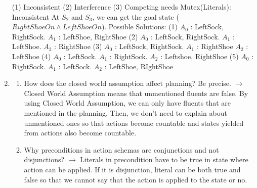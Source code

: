 \documentclass[10pt]{article}
\begin{document}
\begin{enumerate}
\newline
(1) Inconsistent \newline
(2) Interference \newline
(3) Competing needs \newline
\newline
Mutex(Literals): Inconsistent \newline
\newline
At $S_2$ and $S_3$, we can get the goal state ($RightShoeOn \wedge LeftShoeOn$). \newline
Possible Solutions: \newline
(1) $A_0$ : LeftSock, RightSock. \space $A_1$ : LeftShoe, RightShoe \newline
(2) $A_0$ : LeftSock, RightSock. \space $A_1$ : LeftShoe. \space $A_2$ : RightShoe \newline
(3) $A_0$ : LeftSock, RightSock. \space $A_1$ : RightShoe \space $A_2$ : LeftShoe \newline
(4) $A_0$ : LeftSock. \space $A_1$ : RightSock. \space $A_2$ : Leftshoe, RightShoe \newline
(5) $A_0$ : RightSock. \space $A_1$ : LeftSock. \space $A_2$ : LeftShoe, RIghtShoe \newline
\item 
\begin{enumerate}
\item How does the closed world assumption affect planning? Be precise. \newline
$\rightarrow$ \newline
Closed World Assumption means that unmentioned fluents are false. By using Closed World Assumption, we can only have fluents that are mentioned in the planning. Then, we don't need to explain about unmentioned ones so that actions become countable and states yielded from actions also become countable. \newline

\item Why preconditions in action schemas are conjunctions and not disjunctions? \newline
$\rightarrow$ \newline
Literals in precondition have to be true in state where action can be applied. If it is disjunction, literal can be both true and false so that we cannot say that the action is applied to the state or no. \newline


\end{enumerate}
\end{enumerate}
\end{document}
